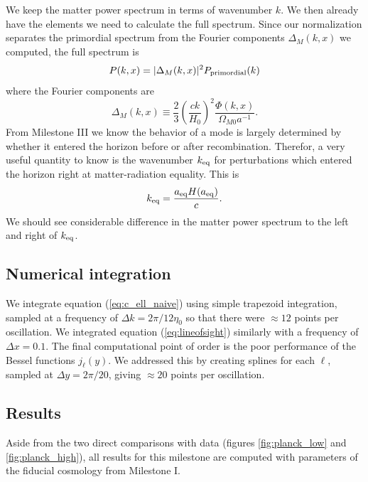\documentclass[aps,prl,twocolumn,groupedaddress,nofootinbib]{revtex4-2}
\begin{document}
We keep the matter power spectrum in terms of wavenumber $k$. We then already have the elements we need to calculate the full spectrum. Since our normalization separates the primordial spectrum from the Fourier components $\Delta_M(k, x)$ we computed, the full spectrum is
\begin{equation}
    P(k,x) = |\Delta_M(k,x)|^2P_{\rm primordial}(k)
    \label{eq:matterpwr}
\end{equation}
where the Fourier components are
\begin{equation}
    \Delta_M(k,x) \equiv \frac{2}{3}\left(\frac{ck}{H_0}\right)^2 \frac{\Phi(k,x)}{\Omega_{M0}a^{-1}}.
\end{equation}
From Milestone III we know the behavior of a mode is largely determined by whether it entered the horizon before or after recombination. Therefor, a very useful quantity to know is the wavenumber $k_{\rm{eq}}$ for perturbations which entered the horizon right at matter-radiation equality. This is
\begin{equation}
    k_{\rm{eq}} = \frac{a_{\rm eq} H(a_{\rm eq})}{c}.
    \label{eq:k_eq}
\end{equation}
We should see considerable difference in the matter power spectrum to the left and right of $k_{\rm{eq}}$.
\subsection{Numerical integration}
We integrate equation (\ref{eq:c_ell_naive}) using simple trapezoid integration, sampled at a frequency of $\Delta k = 2\pi/12\eta_0$ so that there were $\approx 12$ points per oscillation. We integrated equation (\ref{eq:lineofsight}) similarly with a frequency of $\Delta x=0.1$. The final computational point of order is the poor performance of the Bessel functions $j_\ell(y)$. We addressed this by creating splines for each $\ell$, sampled at $\Delta y=2\pi/20$, giving $\approx 20$ points per oscillation.

\subsection{Results}
Aside from the two direct comparisons with data (figures \ref{fig:planck_low} and \ref{fig:planck_high}), all results for this milestone are computed with parameters of the fiducial cosmology from Milestone I.
\end{document}
